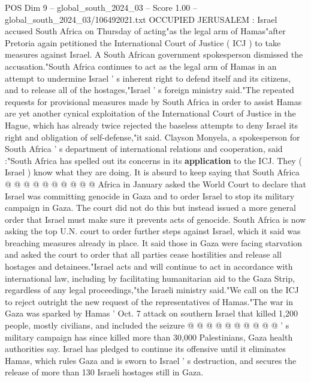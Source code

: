\begin{textsample}{POS Dim 9 – global\_south\_2024\_03 – Score 1.00 – global\_south\_2024\_03/106492021.txt}  \label{ex:f9_pos_070}
OCCUPIED JERUSALEM : Israel accused South Africa on Thursday of acting"as the legal arm of Hamas"after Pretoria again petitioned the International Court of Justice ( ICJ ) to take measures against Israel.
A South African government spokesperson dismissed the accusation."South Africa continues to act as the legal arm of Hamas in an attempt to undermine Israel ' s inherent right to defend itself and its citizens, and to release all of the hostages,"Israel ' s foreign ministry said."The repeated requests for provisional measures made by South Africa in order to assist Hamas are yet another cynical exploitation of the International Court of Justice in the Hague, which has already twice rejected the baseless attempts to deny Israel its right and obligation of self-defense,"it said.
Clayson Monyela, a spokesperson for South Africa ' s department of international relations and cooperation, said :"South Africa has spelled out its concerns in its \textbf{application} to the ICJ.
They ( Israel ) know what they are doing.
It is absurd to keep saying that South Africa @ @ @ @ @ @ @ @ @ @ Africa in January asked the World Court to declare that Israel was committing genocide in Gaza and to order Israel to stop its military campaign in Gaza.
The court did not do this but instead issued a more general order that Israel must make sure it prevents acts of genocide.
South Africa is now asking the top U.N. court to order further steps against Israel, which it said was breaching measures already in place.
It said those in Gaza were facing starvation and asked the court to order that all parties cease hostilities and release all hostages and detainees."Israel acts and will continue to act in accordance with international law, including by facilitating humanitarian aid to the Gaza Strip, regardless of any legal proceedings,"the Israeli ministry said."We call on the ICJ to reject outright the new request of the representatives of Hamas."The war in Gaza was sparked by Hamas ' Oct. 7 attack on southern Israel that killed 1,200 people, mostly civilians, and included the seizure @ @ @ @ @ @ @ @ @ @ ' s military campaign has since killed more than 30,000 Palestinians, Gaza health authorities say.
Israel has pledged to continue its offensive until it eliminates Hamas, which rules Gaza and is sworn to Israel ' s destruction, and secures the release of more than 130 Israeli hostages still in Gaza.

\end{textsample}
